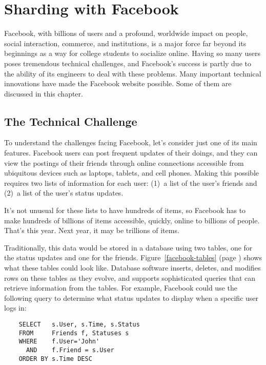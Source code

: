 \chapter{Sharding with Facebook}

Facebook,
with billions of users and a profound, worldwide impact
on people, social interaction, commerce, and institutions,
is a major force far beyond its beginnings
as a way for college students to socialize online.
Having so many users poses tremendous technical challenges,
and Facebook's success is partly due to
the ability of its engineers to deal with these problems.
Many important technical innovations
have made the Facebook website possible.
Some of them are discussed in this chapter.

\section{The Technical Challenge}

To understand the challenges facing Facebook,
let's consider just one of its main features.
Facebook users can post frequent updates of their doings,
and they can view the postings of their friends through online connections
accessible from ubiquitous devices such as laptops, tablets, and cell phones.
Making this possible requires two lists of information for each user:
(1)~a list of the user's friends and
(2)~a list of the user's status updates.

It's not unusual for these lists to have hundreds of items,
so Facebook has to make hundreds of billions of items
accessible, quickly, online to billions of people.
That's this year. Next year, it may be trillions of items.

Traditionally, this data would be stored in a database
using two tables, one for the status updates
and one for the friends.  
Figure~\ref{facebook-tables} (page \pageref{facebook-tables})
shows what these tables could look like.
Database software inserts, deletes, and modifies
rows on these tables as they evolve,
and supports sophisticated queries that can
retrieve information from the tables.
For example, Facebook could use the following query to determine
what status updates to display when a specific user logs in:
\begin{code}
\begin{verbatim}
	SELECT   s.User, s.Time, s.Status
	FROM     Friends f, Statuses s
	WHERE    f.User='John'
	  AND    f.Friend = s.User
	ORDER BY s.Time DESC
\end{verbatim}
\end{code}

